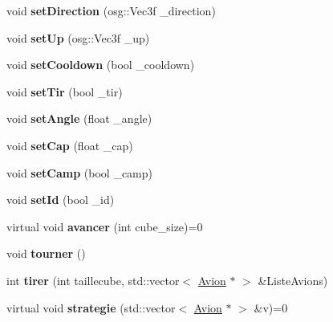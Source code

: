 \begin{DoxyCompactItemize}
\item 
\hypertarget{classAvion_a64c950f24ec240aefa8343d1fda76578}{void {\bfseries set\+Direction} (osg\+::\+Vec3f \+\_\+direction)}\label{classAvion_a64c950f24ec240aefa8343d1fda76578}

\item 
\hypertarget{classAvion_af070e9bf089a987cf1ba78181145126e}{void {\bfseries set\+Up} (osg\+::\+Vec3f \+\_\+up)}\label{classAvion_af070e9bf089a987cf1ba78181145126e}

\item 
\hypertarget{classAvion_a3c088c4b5369d4a1c46fe3fc451a682f}{void {\bfseries set\+Cooldown} (bool \+\_\+cooldown)}\label{classAvion_a3c088c4b5369d4a1c46fe3fc451a682f}

\item 
\hypertarget{classAvion_a847b958c4b2c530b819196f6c0d01a99}{void {\bfseries set\+Tir} (bool \+\_\+tir)}\label{classAvion_a847b958c4b2c530b819196f6c0d01a99}

\item 
\hypertarget{classAvion_a5ebe5ab08695534b0055267b52fd3c72}{void {\bfseries set\+Angle} (float \+\_\+angle)}\label{classAvion_a5ebe5ab08695534b0055267b52fd3c72}

\item 
\hypertarget{classAvion_af022ceaeecc558ffb3774d5231953f45}{void {\bfseries set\+Cap} (float \+\_\+cap)}\label{classAvion_af022ceaeecc558ffb3774d5231953f45}

\item 
\hypertarget{classAvion_a20150470b5fc46b6fe075537ce9e11af}{void {\bfseries set\+Camp} (bool \+\_\+camp)}\label{classAvion_a20150470b5fc46b6fe075537ce9e11af}

\item 
\hypertarget{classAvion_a840877152d6d7db8184d4f5226da3320}{void {\bfseries set\+Id} (bool \+\_\+id)}\label{classAvion_a840877152d6d7db8184d4f5226da3320}

\item 
\hypertarget{classAvion_a9a757788c8f4aa550b32640953cf6654}{virtual void {\bfseries avancer} (int cube\+\_\+size)=0}\label{classAvion_a9a757788c8f4aa550b32640953cf6654}

\item 
\hypertarget{classAvion_a931f19e382481c09584e5d457e3903d4}{void {\bfseries tourner} ()}\label{classAvion_a931f19e382481c09584e5d457e3903d4}

\item 
\hypertarget{classAvion_a568ddefe4a5bbb9ffcde3cf975ae97aa}{int {\bfseries tirer} (int taillecube, std\+::vector$<$ \hyperlink{classAvion}{Avion} $\ast$ $>$ \&Liste\+Avions)}\label{classAvion_a568ddefe4a5bbb9ffcde3cf975ae97aa}

\item 
\hypertarget{classAvion_a7fdbb0c762a91c31d8bbb3be9e5c0740}{virtual void {\bfseries strategie} (std\+::vector$<$ \hyperlink{classAvion}{Avion} $\ast$ $>$ \&v)=0}\label{classAvion_a7fdbb0c762a91c31d8bbb3be9e5c0740}

\end{DoxyCompactItemize}
